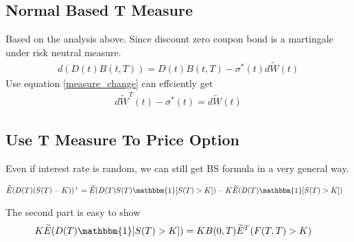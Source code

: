 \documentclass[11pt, oneside]{article}   	%
\begin{document}
\subsection{Normal Based T Measure}
Based on the analysis above. Since discount zero coupon bond is a martingale under risk neutral measure.
\begin{equation}
\begin{aligned}
d(D(t)B(t, T)) = D(t)B(t, T) - \sigma^\ast(t) d\widetilde{W}(t)
\end{aligned}
\end{equation}
Use equation \ref{measure_change} can effciently get
\begin{equation}
\begin{aligned}
d\widetilde{W}^T(t) - \sigma^\ast(t) = d\widetilde{W}(t)
\end{aligned}
\end{equation}

\subsection{Use T Measure To Price Option}
Even if interest rate is random, we can still get BS formula in a very general way.

\begin{equation}
\begin{aligned}
\widetilde{E}(D(T)(S(T) - K))^+ &= \widetilde{E}(D(T)S(T) \mathbbm{1} [ S(T) > K ]) - K\widetilde{E}(D(T)\mathbbm{1} [ S(T) > K ])
\end{aligned}
\end{equation}

The second part is easy to show
\begin{equation}
\begin{aligned}
 K\widetilde{E}(D(T)\mathbbm{1} [ S(T) > K ]) &= KB(0, T) \widetilde{E} ^ T (F(T, T) > K)
\end{aligned}
\end{equation}
\end{document}
